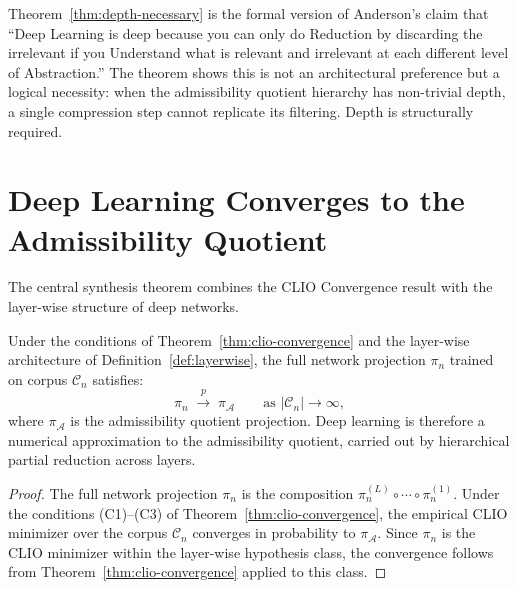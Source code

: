 \documentclass[12pt, a4paper, oneside]{book}
\newcommand{\Adm}{\mathcal{A}}
\newcommand{\C}{\mathcal{C}}
\newcommand{\proj}{\pi}
\newcommand{\projA}{\pi_{\!\Adm}}
\begin{document}
\begin{remark}
Theorem~\ref{thm:depth-necessary} is the formal version of Anderson's
claim that ``Deep Learning is deep because you can only do Reduction by
discarding the irrelevant if you Understand what is relevant and
irrelevant at each different level of Abstraction.'' The theorem shows
this is not an architectural preference but a logical necessity: when
the admissibility quotient hierarchy has non-trivial depth, a single
compression step cannot replicate its filtering. Depth is structurally
required.
\end{remark}

\section{Deep Learning Converges to the Admissibility Quotient}

The central synthesis theorem combines the CLIO Convergence result with
the layer-wise structure of deep networks.

\begin{theorem}
\label{thm:dl-convergence}
Under the conditions of Theorem~\ref{thm:clio-convergence} and the
layer-wise architecture of Definition~\ref{def:layerwise}, the full
network projection $\proj_n$ trained on corpus $\C_n$ satisfies:
\[
  \proj_n \;\xrightarrow{p}\; \projA \qquad \text{as } |\C_n| \to \infty,
\]
where $\projA$ is the admissibility quotient projection.
Deep learning is therefore a numerical approximation to the admissibility
quotient, carried out by hierarchical partial reduction across layers.
\end{theorem}

\begin{proof}
The full network projection $\proj_n$ is the composition
$\proj^{(L)}_n \circ \cdots \circ \proj^{(1)}_n$. Under the conditions
(C1)--(C3) of Theorem~\ref{thm:clio-convergence}, the empirical CLIO
minimizer over the corpus $\C_n$ converges in probability to $\projA$.
Since $\proj_n$ is the CLIO minimizer within the layer-wise hypothesis
class, the convergence follows from Theorem~\ref{thm:clio-convergence}
applied to this class.
\end{proof}
\end{document}
